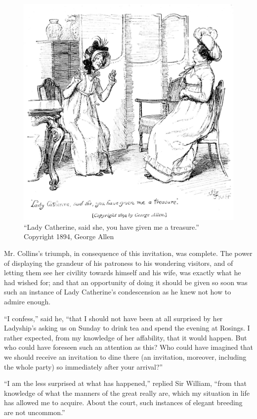 \begin{figure}[htbp]
    \centering
    \includegraphics[width=\textwidth]{illustrations/i_229_a.jpg}
    \caption{“Lady Catherine, said she, you have given me a treasure.”\\ Copyright 1894, George Allen}
    \label{fig:image}
\end{figure}


Mr. Collins's triumph, in consequence of this invitation, was complete. The power of displaying the grandeur of his patroness to his wondering visitors, and of letting them see her civility towards himself and his wife, was exactly what he had wished for; and that an opportunity of doing it should be given so soon was such an instance of Lady Catherine's condescension as he knew not how to admire enough.

``I confess,'' said he, ``that I should not have been at all surprised by her Ladyship's asking us on Sunday to drink tea and spend the evening at Rosings. I rather expected, from my knowledge of her affability, that it would happen. But who could have foreseen such an attention as this? Who could have imagined that we should receive an invitation to dine there (an invitation, moreover, including the whole party) so immediately after your arrival?''

``I am the less surprised at what has happened,'' replied Sir William, ``from that knowledge of what the manners of the great really are, which my situation in life has allowed me to acquire. About the court, such instances of elegant breeding are not uncommon.''


